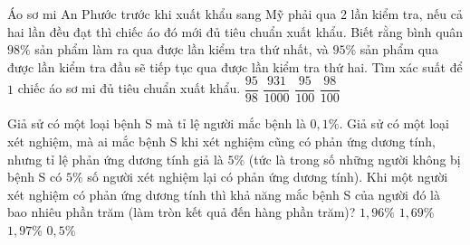 \begin{ex}%
	Áo sơ mi An Phước trước khi xuất khẩu sang Mỹ phải qua 2 lần  kiểm tra, nếu cả hai lần đều đạt thì chiếc áo đó mới đủ tiêu chuẩn xuất khẩu. Biết rằng bình quân $98\%$ sản phẩm làm ra qua được lần kiểm tra thứ nhất, và $95\%$ sản phẩm qua được lần kiểm tra đầu sẽ tiếp tục qua được lần kiểm tra thứ hai. Tìm xác suất để $1$ chiếc áo sơ mi đủ tiêu chuẩn xuất khẩu.
	\choice 
		{$\dfrac{95}{98}$} 
		{\True $\dfrac{931}{1000}$} 
		{$\dfrac{95}{100}$} 
		{$\dfrac{98}{100}$} 
\end{ex}

\begin{ex}%
	Giả sử có một loại bệnh S mà tỉ lệ người mắc bệnh là $0{,}1\%$. Giả sử có một loại xét nghiệm, mà ai mắc bệnh S khi xét nghiệm cũng có phản ứng dương tính, nhưng tỉ lệ phản ứng dương tính giả là $5\%$ (tức là trong số những người không bị bệnh S có $5\%$ số người xét  nghiệm lại có phản ứng dương tính). Khi một người xét nghiệm có phản ứng dương tính thì khả năng mắc bệnh S của người đó là bao nhiêu phần trăm (làm tròn kết quả đến hàng phần trăm)?
	\choice 
		{\True $1{,}96\%$} 
		{$1{,}69\%$} 
		 {$1{,}97\%$}
		{$0{,}5\%$} 
\end{ex}

